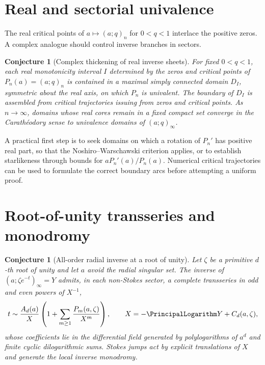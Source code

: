 \documentclass[11pt,a4paper,oneside,openany]{book}
\newtheorem{conjecture}[theorem]{Conjecture}
\theoremstyle{definition}
\theoremstyle{remark}
\begin{document}
\section{Real and sectorial univalence}

The real critical points of \(a\mapsto(a;q)_n\) for \(0<q<1\) interlace the
positive zeros.  A complex analogue should control inverse branches in
sectors.

\begin{conjecture}[Complex thickening of real inverse sheets]
For fixed \(0<q<1\), each real monotonicity interval \(I\) determined by the
zeros and critical points of \(P_n(a)=(a;q)_n\) is contained in a maximal
simply connected domain \(D_I\), symmetric about the real axis, on which
\(P_n\) is univalent.  The boundary of \(D_I\) is assembled from critical
trajectories issuing from zeros and critical points.  As \(n\to\infty\),
domains whose real cores remain in a fixed compact set converge in the
Carath\'eodory sense to univalence domains of \((a;q)_\infty\).
\end{conjecture}

A practical first step is to seek domains on which a rotation of \(P_n'\)
has positive real part, so that the Noshiro--Warschawski criterion applies,
or to establish starlikeness through bounds for \(aP_n'(a)/P_n(a)\).
Numerical critical trajectories can be used to formulate the correct boundary
arcs before attempting a uniform proof.

\section{Root-of-unity transseries and monodromy}

\begin{conjecture}[All-order radial inverse at a root of unity]
Let \(\zeta\) be a primitive \(d\)-th root of unity and let \(a\) avoid the
radial singular set.  The inverse of
\((a;\zeta e^{-t})_\infty=Y\) admits, in each non-Stokes sector, a complete
transseries in odd and even powers of \(X^{-1}\),
\begin{equation}\label{eq:rootunity-inverse-conjectural}
 t\sim\frac{A_d(a)}{X}
 \left(1+\sum_{m\ge1}\frac{P_m(a,\zeta)}{X^m}\right),
 \qquad X=-\PrincipalLogarithm Y+C_d(a,\zeta),
\end{equation}
whose coefficients lie in the differential field generated by polylogarithms
of \(a^d\) and finite cyclic dilogarithmic sums.  Stokes jumps act by explicit
translations of \(X\) and generate the local inverse monodromy.
\end{conjecture}
\end{document}

